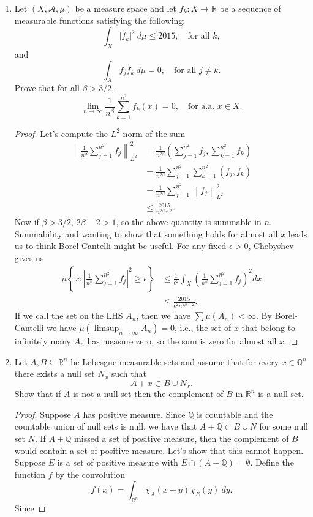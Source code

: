 \documentclass[11pt,letterpaper]{report}
\newcommand{\reals}{\mathbb{R}}
\newcommand{\mcal}[1]{\mathcal{#1}}
\newcommand{\rationals}{\mathbb{Q}}
\newcommand{\Lp}[2]{\left\|{#1}\right\|_{L^{#2}}}
\begin{document}
\begin{enumerate}
	\item Let $(X, \mcal{A}, \mu)$ be a measure space and let $f_k: X\to \reals$ be a sequence of measurable functions satisfying the following:
	\[
	\int_X |f_k|^2\ d\mu\leq 2015,\quad \text{for all }k,
	\]
	and
	\[
	\int_X f_jf_k\ d\mu=0,\quad \text{for all }j\neq k.
	\]
	Prove that for all $\beta>3/2$,
	\[
	\lim_{n\to \infty}\frac{1}{n^\beta}\sum_{k=1}^{n^2}f_k(x) = 0,\quad \text{for a.a. } x\in X.
	\]
	\begin{proof}
		Let's compute the $L^2$ norm of the sum
		\begin{align*}
			\left\|\frac{1}{n^\beta}\sum_{j=1}^{n^2}f_j\right\|_{L^2}^2 &= \frac{1}{n^{2\beta}}\left(\sum_{j=1}^{n^2}f_j, \sum_{k=1}^{n^2}f_k\right)\\
			&= \frac{1}{n^{2\beta}}\sum_{j=1}^{n^2}\sum_{k=1}^{n^2}(f_j, f_k)\\
			&= \frac{1}{n^{2\beta}}\sum_{j=1}^{n^2}\Lp{f_j}{2}^2\\
			&\leq \frac{2015}{n^{2\beta-2}}.
		\end{align*}
		Now if $\beta>3/2$, $2\beta-2>1$, so the above quantity is summable in $n$. Summability and wanting to show that something holds for almost all $x$ leads us to think Borel-Cantelli might be useful. For any fixed $\epsilon>0$, Chebyshev gives us
		\begin{align*}
			\mu\left\{x: \left|\frac{1}{n^\beta}\sum_{j=1}^{n^2}f_j\right|^2\geq\epsilon\right\} &\leq \frac{1}{\epsilon^2}\int_X \left(\frac{1}{n^\beta}\sum_{j=1}^{n^2}f_j\right)^2dx\\
			&\leq \frac{2015}{\epsilon^2n^{2\beta-2}}.
		\end{align*}
		If we call the set on the LHS $A_n$, then we have $\sum \mu(A_n)<\infty$. By Borel-Cantelli we have $\mu(\limsup_{n\to \infty}A_n) = 0$, i.e., the set of $x$ that belong to infinitely many $A_n$ has measure zero, so the sum is zero for almost all $x$.
	\end{proof}

	\item Let $A, B\subseteq \reals^n$ be Lebesgue measurable sets and assume that for every $x\in \rationals^n$ there exists a null set $N_x$ such that
	\[
	A+x\subset B\cup N_x.
	\]
	Show that if $A$ is not a null set then the complement of $B$ in $\reals^n$ is a null set.
	\begin{proof}
		Suppose $A$ has positive measure. Since $\rationals$ is countable and the countable union of null sets is null, we have that $A+\rationals \subset B \cup N$ for some null set $N$. If $A+\rationals$ missed a set of positive measure, then the complement of $B$ would contain a set of positive measure. Let's show that this cannot happen.\\

		\noindent Suppose $E$ is a set of positive measure with $E\cap (A+\rationals) = \emptyset$. Define the function $f$ by the convolution
		\[
		f(x) = \int_{\reals^n}\chi_A(x-y)\chi_E(y)\ dy.
		\]
		Since 
	\end{proof}
\end{enumerate}
\end{document}
